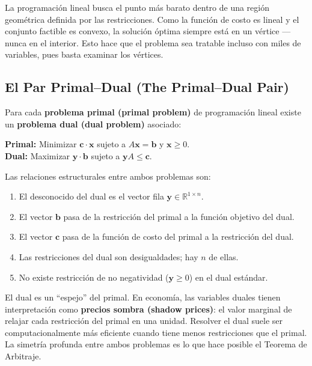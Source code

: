 \documentclass[12pt]{article}
\begin{document}
\begin{intuicion}
La programaci\'on lineal busca el punto m\'as barato dentro de una regi\'on
geom\'etrica definida por las restricciones. Como la funci\'on de costo es
lineal y el conjunto factible es convexo, la soluci\'on \'optima siempre
est\'a en un v\'ertice --- nunca en el interior. Esto hace que el problema
sea tratable incluso con miles de variables, pues basta examinar los v\'ertices.
\end{intuicion}

\subsection{El Par Primal--Dual (The Primal--Dual Pair)}

Para cada \textbf{problema primal (primal problem)} de programaci\'on lineal
existe un \textbf{problema dual (dual problem)} asociado:

\medskip
\noindent\textbf{Primal:} Minimizar $\mathbf{c} \cdot \mathbf{x}$ sujeto a
$A\mathbf{x} = \mathbf{b}$ y $\mathbf{x} \geq 0$.\\
\textbf{Dual:} Maximizar $\mathbf{y} \cdot \mathbf{b}$ sujeto a
$\mathbf{y}A \leq \mathbf{c}$.
\medskip

Las relaciones estructurales entre ambos problemas son:
\begin{enumerate}
  \item El desconocido del dual es el vector fila $\mathbf{y} \in \mathbb{R}^{1 \times n}$.
  \item El vector $\mathbf{b}$ pasa de la restricci\'on del primal a la
        funci\'on objetivo del dual.
  \item El vector $\mathbf{c}$ pasa de la funci\'on de costo del primal a
        la restricci\'on del dual.
  \item Las restricciones del dual son desigualdades; hay $n$ de ellas.
  \item No existe restricci\'on de no negatividad ($\mathbf{y} \geq 0$) en el
        dual est\'andar.
\end{enumerate}

\begin{intuicion}
El dual es un ``espejo'' del primal. En econom\'ia, las variables duales tienen
interpretaci\'on como \textbf{precios sombra (shadow prices)}: el valor marginal
de relajar cada restricci\'on del primal en una unidad. Resolver el dual suele
ser computacionalmente m\'as eficiente cuando tiene menos restricciones que el
primal. La simetr\'ia profunda entre ambos problemas es lo que hace posible
el Teorema de Arbitraje.
\end{intuicion}
\end{document}
